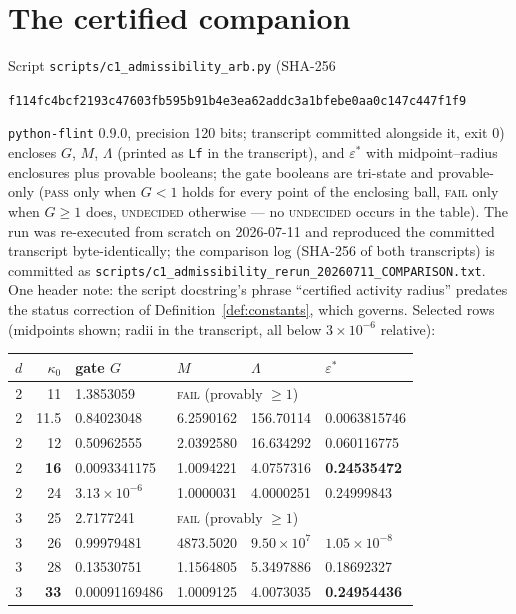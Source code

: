 \documentclass[11pt]{article}
\newcommand{\lean}[1]{\texttt{#1}}
\begin{document}
\section{The certified companion}\label{sec:certified}

Script \lean{scripts/c1\_admissibility\_arb.py} (SHA-256
\begin{center}\small
\lean{f114fc4bcf2193c47603fb595b91b4e3ea62addc3a1bfebe0aa0c147c447f1f9}
\end{center}
\noindent \lean{python-flint} 0.9.0, precision 120 bits; transcript
committed alongside it, exit 0) encloses
$G$, $M$, $\Lambda$ (printed as \lean{Lf} in the transcript), and
$\varepsilon^*$ with midpoint--radius enclosures plus provable
booleans; the gate booleans are tri-state and provable-only
(\textsc{pass} only when $G < 1$ holds for every point of the
enclosing ball, \textsc{fail} only when $G \ge 1$ does,
\textsc{undecided} otherwise --- no \textsc{undecided} occurs in the
table).  The run was re-executed from scratch on 2026-07-11 and
reproduced the committed transcript byte-identically; the comparison
log (SHA-256 of both transcripts) is committed as
\lean{scripts/c1\_admissibility\_rerun\_20260711\_COMPARISON.txt}.
One header note: the script docstring's phrase ``certified activity
radius'' predates the status correction of
Definition~\ref{def:constants}, which governs.  Selected rows
(midpoints shown; radii in the transcript, all below $3 \times
10^{-6}$ relative):

\begin{center}
\begin{tabular}{@{}rrllll@{}}
\toprule
$d$ & $\kappa_0$ & gate $G$ & $M$ & $\Lambda$ & $\varepsilon^*$ \\
\midrule
2 & 11   & 1.3853059 & \multicolumn{3}{l}{\textsc{fail} (provably $\ge 1$)} \\
2 & 11.5 & 0.84023048 & 6.2590162 & 156.70114 & 0.0063815746 \\
2 & 12   & 0.50962555 & 2.0392580 & 16.634292 & 0.060116775 \\
2 & \textbf{16} & 0.0093341175 & 1.0094221 & 4.0757316 & \textbf{0.24535472} \\
2 & 24   & $3.13\times 10^{-6}$ & 1.0000031 & 4.0000251 & 0.24999843 \\
3 & 25   & 2.7177241 & \multicolumn{3}{l}{\textsc{fail} (provably $\ge 1$)} \\
3 & 26   & 0.99979481 & 4873.5020 & $9.50\times 10^{7}$ & $1.05\times 10^{-8}$ \\
3 & 28   & 0.13530751 & 1.1564805 & 5.3497886 & 0.18692327 \\
3 & \textbf{33} & 0.00091169486 & 1.0009125 & 4.0073035 & \textbf{0.24954436} \\
\bottomrule
\end{tabular}
\end{center}
\end{document}
